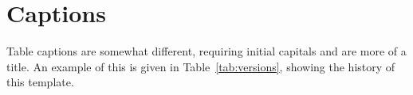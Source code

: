 \section{Captions}



Table captions are somewhat different, requiring initial capitals and are more of a title. An example of this is given in Table~\ref{tab:versions}, showing the history of this template.


